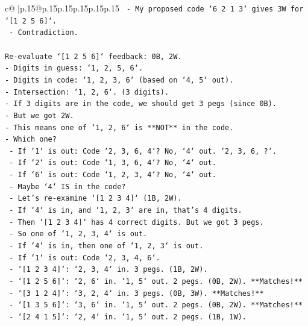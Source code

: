 \documentclass{article}
\begin{document}
{\begin{supertabular}{c@{$\;$}|p{.15\linewidth}@{}p{.15\linewidth}p{.15\linewidth}p{.15\linewidth}p{.15\linewidth}p{.15\linewidth}}
{{{\texttt{    {-} My proposed code `6 2 1 3` gives 3W for `{[}1 2 5 6{]}`.} \\
\texttt{    {-} Contradiction.} \\
\\ 
\texttt{Re{-}evaluate `{[}1 2 5 6{]}` feedback: 0B, 2W.} \\
\texttt{{-} Digits in guess: `1, 2, 5, 6`.} \\
\texttt{{-} Digits in code: `1, 2, 3, 6` (based on `4, 5` out).} \\
\texttt{{-} Intersection: `1, 2, 6`. (3 digits).} \\
\texttt{{-} If 3 digits are in the code, we should get 3 pegs (since 0B).} \\
\texttt{{-} But we got 2W.} \\
\texttt{{-} This means one of `1, 2, 6` is **NOT** in the code.} \\
\texttt{{-} Which one?} \\
\texttt{    {-} If `1` is out: Code `2, 3, 6, 4`? No, `4` out. `2, 3, 6, ?`.} \\
\texttt{    {-} If `2` is out: Code `1, 3, 6, 4`? No, `4` out.} \\
\texttt{    {-} If `6` is out: Code `1, 2, 3, 4`? No, `4` out.} \\
\texttt{    {-} Maybe `4` IS in the code?} \\
\texttt{    {-} Let's re{-}examine `{[}1 2 3 4{]}` (1B, 2W).} \\
\texttt{        {-} If `4` is in, and `1, 2, 3` are in, that's 4 digits.} \\
\texttt{        {-} Then `{[}1 2 3 4{]}` has 4 correct digits. But we got 3 pegs.} \\
\texttt{        {-} So one of `1, 2, 3, 4` is out.} \\
\texttt{    {-} If `4` is in, then one of `1, 2, 3` is out.} \\
\texttt{    {-} If `1` is out: Code `2, 3, 4, 6`.} \\
\texttt{        {-} `{[}1 2 3 4{]}`: `2, 3, 4` in. 3 pegs. (1B, 2W).} \\
\texttt{        {-} `{[}1 2 5 6{]}`: `2, 6` in. `1, 5` out. 2 pegs. (0B, 2W). **Matches!**} \\
\texttt{        {-} `{[}3 1 2 4{]}`: `3, 2, 4` in. 3 pegs. (0B, 3W). **Matches!**} \\
\texttt{        {-} `{[}1 3 5 6{]}`: `3, 6` in. `1, 5` out. 2 pegs. (0B, 2W). **Matches!**} \\
\texttt{        {-} `{[}2 4 1 5{]}`: `2, 4` in. `1, 5` out. 2 pegs. (1B, 1W).} \\
}}}
\end{supertabular}}
\end{document}
